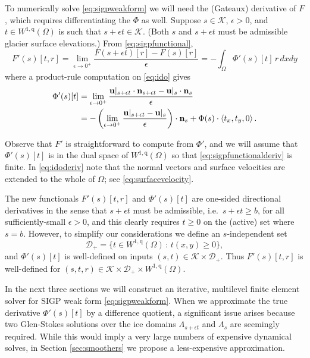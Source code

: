 \documentclass[letterpaper,final,12pt,reqno]{amsart}
\theoremstyle{claim}
\newcommand{\eps}{\epsilon}
\newcommand{\bn}{\mathbf{n}}
\newcommand{\bu}{\mathbf{u}}
\newcommand{\qq}{{\text{q}}}
\numberwithin{equation}{section}
\numberwithin{figure}{section}
\numberwithin{table}{section}
\numberwithin{theorem}{section}
\begin{document}
To numerically solve \eqref{eq:sigpweakform} we will need the (Gateaux) derivative of $F$, which requires differentiating the $\Phi$ as well.  Suppose $s\in \mathcal{K}$, $\eps>0$, and $t \in W^{1,\qq}(\Omega)$ is such that $s+\eps t \in \mathcal{K}$.  (Both $s$ and $s+\eps t$ must be admissible glacier surface elevations.)  From \eqref{eq:sigpfunctional},
\begin{equation}
F'(s)[t,r] = \lim_{\eps\to 0^+} \frac{F(s+\eps t)[r] - F(s)[r]}{\eps} = - \int_\Omega \Phi'(s)[t]\, r \,dx dy \label{eq:sigpfunctionalderiv}
\end{equation}
where a product-rule computation on \eqref{eq:ido} gives
\begin{align}
\Phi'(s)[t] &= \lim_{\eps\to 0^+} \frac{\bu|_{s+\eps t} \cdot \bn_{s+\eps t} - \bus \cdot \bn_s}{\eps} \label{eq:idoderiv} \\
    &= - \left(\lim_{\eps\to 0^+} \frac{\bu|_{s+\eps t} - \bus}{\eps}\right) \cdot \bn_s + \Phi(s) \cdot \left<t_x,t_y,0\right>. \notag
\end{align}

Observe that $F'$ is straightforward to compute from $\Phi'$, and we will assume that $\Phi'(s)[t]$ is in the dual space of $W^{1,\qq}(\Omega)$ so that \eqref{eq:sigpfunctionalderiv} is finite.  In \eqref{eq:idoderiv} note that the normal vectors and surface velocities are extended to the whole of $\Omega$; see \eqref{eq:surfacevelocity}.

The new functionals $F'(s)[t,r]$ and $\Phi'(s)[t]$ are one-sided directional derivatives in the sense that $s+\eps t$ must be admissible, i.e.~$s+\eps t\ge b$, for all sufficiently-small $\eps>0$, and this clearly requires $t\ge 0$ on the (active) set where $s=b$.  However, to simplify our considerations we define an $s$-independent set
\begin{equation}
\mathcal{D}_+ = \{t \in W^{1,\qq}(\Omega) \,:\, t(x,y) \ge 0\}, \label{eq:infdefectset}
\end{equation}
and $\Phi'(s)[t]$ is well-defined on inputs $(s,t) \in \mathcal{K} \times \mathcal{D}_+$.  Thus $F'(s)[t,r]$ is well-defined for $(s,t,r) \in \mathcal{K} \times \mathcal{D}_+ \times W^{1,\qq}(\Omega)$.

In the next three sections we will construct an iterative, multilevel finite element solver for SIGP weak form \eqref{eq:sigpweakform}.  When we approximate the true derivative $\Phi'(s)[t]$ by a difference quotient, a significant issue arises because two Glen-Stokes solutions over the ice domains $\Lambda_{s+\eps t}$ and $\Lambda_s$ are seemingly required.  While this would imply a very large numbers of expensive dynamical solves, in Section \ref{sec:smoothers} we propose a less-expensive approximation.
\end{document}
